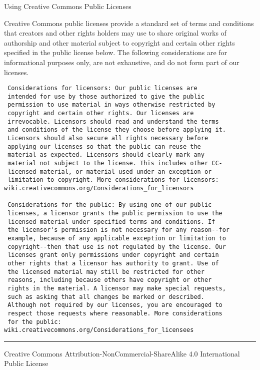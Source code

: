 \documentclass[]{scrbook}
\begin{document}
Using Creative Commons Public Licenses

Creative Commons public licenses provide a standard set of terms and
conditions that creators and other rights holders may use to share
original works of authorship and other material subject to copyright and
certain other rights specified in the public license below. The
following considerations are for informational purposes only, are not
exhaustive, and do not form part of our licenses.

\begin{verbatim}
 Considerations for licensors: Our public licenses are
 intended for use by those authorized to give the public
 permission to use material in ways otherwise restricted by
 copyright and certain other rights. Our licenses are
 irrevocable. Licensors should read and understand the terms
 and conditions of the license they choose before applying it.
 Licensors should also secure all rights necessary before
 applying our licenses so that the public can reuse the
 material as expected. Licensors should clearly mark any
 material not subject to the license. This includes other CC-
 licensed material, or material used under an exception or
 limitation to copyright. More considerations for licensors:
wiki.creativecommons.org/Considerations_for_licensors

 Considerations for the public: By using one of our public
 licenses, a licensor grants the public permission to use the
 licensed material under specified terms and conditions. If
 the licensor's permission is not necessary for any reason--for
 example, because of any applicable exception or limitation to
 copyright--then that use is not regulated by the license. Our
 licenses grant only permissions under copyright and certain
 other rights that a licensor has authority to grant. Use of
 the licensed material may still be restricted for other
 reasons, including because others have copyright or other
 rights in the material. A licensor may make special requests,
 such as asking that all changes be marked or described.
 Although not required by our licenses, you are encouraged to
 respect those requests where reasonable. More considerations
 for the public:
wiki.creativecommons.org/Considerations_for_licensees
\end{verbatim}

\begin{center}\rule{0.5\linewidth}{\linethickness}\end{center}

Creative Commons Attribution-NonCommercial-ShareAlike 4.0 International
Public License
\end{document}
